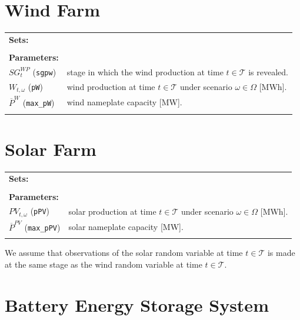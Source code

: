 \documentclass{article}
\begin{document}
\section{Wind Farm}
\label{SEC:WindFarm}

\begin{tabularx}{\textwidth}{l l}
    \textbf{Sets:} \\
    \\
    
    \textbf{Parameters:} \\
	$SG^{WP}_t$ (\verb|sgpw|) & stage in which the wind production at time $t \in \mathcal{T}$ is revealed. \\
	$W_{t, \omega}$ (\verb|pW|) & wind production at time $t \in \mathcal{T}$ under scenario $\omega \in \Omega$ [MWh]. \\
	$\overline{P}^W$ (\verb|max_pW|) & wind nameplate capacity [MW]. \\
	\\  
\end{tabularx}

\section{Solar Farm}
\label{SEC:SolarFarm}

\begin{tabularx}{\textwidth}{l l}
    \textbf{Sets:} \\
    \\
    
    \textbf{Parameters:} \\
	$PV_{t, \omega}$ (\verb|pPV|) & solar production at time $t \in \mathcal{T}$ under scenario $\omega \in \Omega$ [MWh]. \\
	$\overline{P}^{PV}$ (\verb|max_pPV|) & solar nameplate capacity [MW]. \\
	\\  
\end{tabularx}

We assume that observations of the solar random variable at time $t \in \mathcal{T}$ is made at the same stage as the wind random variable at time $t \in \mathcal{T}$.

\section{Battery Energy Storage System}
\label{SEC:BatteryEnergyStorageSystem}
\end{document}
